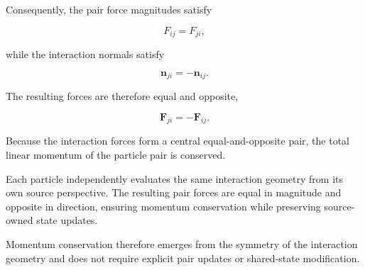 Consequently, the pair force magnitudes satisfy

\begin{equation}
F_{ij}=F_{ji},
\end{equation}

while the interaction normals satisfy

\begin{equation}
\mathbf{n}_{ji}
=
-\mathbf{n}_{ij}.
\end{equation}

The resulting forces are therefore equal and
opposite,

\begin{equation}
\mathbf{F}_{ji}
=
-\mathbf{F}_{ij}.
\end{equation}

Because the interaction forces form a central
equal-and-opposite pair, the total linear momentum
of the particle pair is conserved.

Each particle independently evaluates the same
interaction geometry from its own source
perspective. The resulting pair forces are equal
in magnitude and opposite in direction, ensuring
momentum conservation while preserving source-owned
state updates.

Momentum conservation therefore emerges from the
symmetry of the interaction geometry and does not
require explicit pair updates or shared-state
modification.
